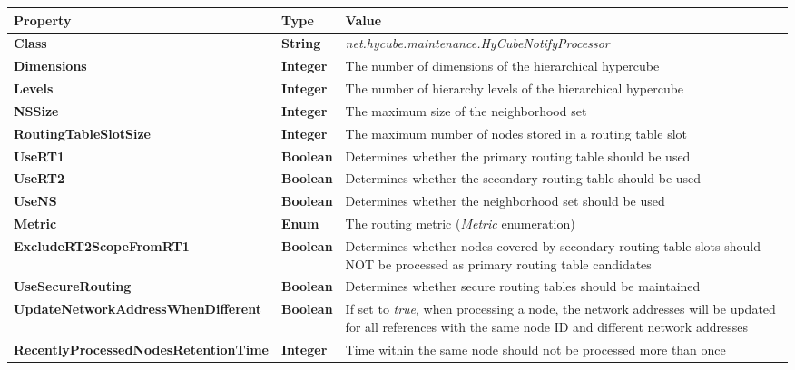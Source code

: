 \begin{table}
\scriptsize
\begin{center}
\begin{tabular}{p{4.8cm} p{2.2cm} p{7.5cm}}
	\hline
	\textbf{Property}										& \textbf{Type}			& \textbf{Value}					\\[1mm]
    \hline
	\textbf{Class}											& \textbf{String}		& \textit{net.hycube.maintenance.HyCubeNotifyProcessor}			\\[1.5mm]
	\textbf{Dimensions}										& \textbf{Integer}		& The number of dimensions of the hierarchical hypercube					\\[1.5mm]
	\textbf{Levels}											& \textbf{Integer}		& The number of hierarchy levels of the hierarchical hypercube				\\[1.5mm]
    \textbf{NSSize}											& \textbf{Integer}		& The maximum size of the neighborhood set									\\[1.5mm]
	\textbf{RoutingTableSlotSize}							& \textbf{Integer}		& The maximum number of nodes stored in a routing table slot				\\[1.5mm]
	\textbf{UseRT1}											& \textbf{Boolean}		& Determines whether the primary routing table should be used				\\[1.5mm]
	\textbf{UseRT2}											& \textbf{Boolean}		& Determines whether the secondary routing table should be used				\\[1.5mm]
	\textbf{UseNS}											& \textbf{Boolean}		& Determines whether the neighborhood set should be used					\\[1.5mm]
	\textbf{Metric}											& \textbf{Enum}			& The routing metric (\emph{Metric} enumeration)							\\[1.5mm]
	\textbf{ExcludeRT2ScopeFromRT1}							& \textbf{Boolean}		& Determines whether nodes covered by secondary routing table slots should NOT be processed as primary routing table candidates		\\[1.5mm]
	\textbf{UseSecureRouting}								& \textbf{Boolean}		& Determines whether secure routing tables should be maintained																	\\[1.5mm]
	\textbf{UpdateNetworkAddressWhenDifferent}				& \textbf{Boolean}		& If set to \emph{true}, when processing a node, the network addresses will be updated for all references with the same node ID and different network addresses	\\[1.5mm]
	\textbf{RecentlyProcessedNodesRetentionTime}			& \textbf{Integer}		& Time within the same node should not be processed more than once					\\[1.5mm]

\end{tabular}
\end{center}
\end{table}
